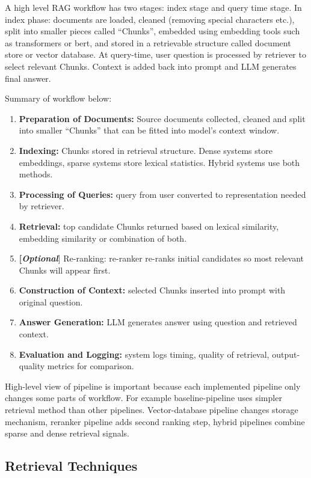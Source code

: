 A high level \ac{RAG} workflow has two stages: index stage and query time stage. In index phase: documents are loaded, cleaned (removing special characters etc.), split into smaller pieces called “Chunks”, embedded using embedding tools such as transformers or bert, and stored in a retrievable structure called document store or vector database. At query-time, user question is processed by retriever to select relevant Chunks. Context is added back into prompt and \ac{LLM} generates final answer.

Summary of workflow below:
\begin{enumerate}
    \item {\textbf{Preparation of Documents:}} Source documents collected, cleaned and split into smaller “Chunks” that can be fitted into model’s context window.
    \item {\textbf{Indexing:}} Chunks stored in retrieval structure. Dense systems store embeddings, sparse systems store lexical statistics. Hybrid systems use both methods.
    \item {\textbf{Processing of Queries:}} query from user converted to representation needed by retriever.
    \item {\textbf{Retrieval:}} top candidate Chunks returned based on lexical similarity, embedding similarity or combination of both.
    \item {\textbf{[\textit{Optional}}] Re-ranking:} re-ranker re-ranks initial candidates so most relevant Chunks will appear first.
    \item {\textbf{Construction of Context:}} selected Chunks inserted into prompt with original question.
    \item {\textbf{Answer Generation:}} \ac{LLM} generates answer using question and retrieved context.
    \item {\textbf{Evaluation and Logging:}} system logs timing, quality of retrieval, output-quality metrics for comparison.
\end{enumerate}

High-level view of pipeline is important because each implemented pipeline only changes some parts of workflow. For example baseline-pipeline uses simpler retrieval method than other pipelines. Vector-database pipeline changes storage mechanism, reranker pipeline adds second ranking step, hybrid pipelines combine sparse and dense retrieval signals.

\subsection{Retrieval Techniques}

